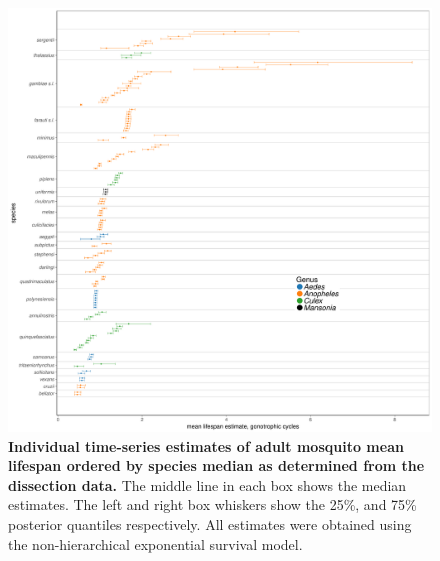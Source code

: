 \documentclass[12pt]{article}
\begin{document}
\begin{figure}[h]
	\centerline{\includegraphics[width=1.3\textwidth]{./Figure_files/dissection_individualEstimates_allSpecies.pdf}}
	\caption{\textbf{Individual time-series estimates of adult mosquito mean lifespan ordered by species median as determined from the dissection data.} The middle line in each box shows the median estimates. The left and right box whiskers show the 25\%, and 75\% posterior quantiles respectively. All estimates were obtained using the non-hierarchical exponential survival model.}
	\label{fig:dissection_individualEstimates_allSpecies}
\end{figure}
\end{document}
